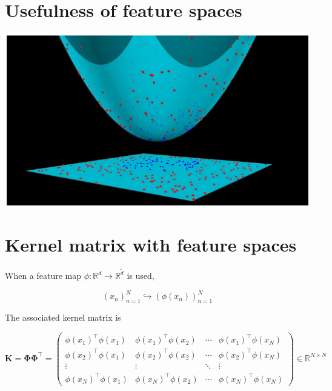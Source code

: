 \documentclass[10pt]{article}
\begin{document}
\section*{Usefulness of feature spaces}
\begin{center}
\includegraphics[max width=\textwidth]{2023_12_30_94b0d65233167cf65e4cg-10}
\end{center}

\section*{Kernel matrix with feature spaces}
When a feature map $\phi: \mathbb{R}^{d} \rightarrow \mathbb{R}^{\tilde{d}}$ is used,

$$
\left(x_{n}\right)_{n=1}^{N} \hookrightarrow\left(\phi\left(x_{n}\right)\right)_{n=1}^{N}
$$

The associated kernel matrix is

$$
\mathbf{K}=\boldsymbol{\Phi} \boldsymbol{\Phi}^{\top}=\left(\begin{array}{cccc}
\phi\left(x_{1}\right)^{\top} \phi\left(x_{1}\right) & \phi\left(x_{1}\right)^{\top} \phi\left(x_{2}\right) & \cdots & \phi\left(x_{1}\right)^{\top} \phi\left(x_{N}\right) \\
\phi\left(x_{2}\right)^{\top} \phi\left(x_{1}\right) & \phi\left(x_{2}\right)^{\top} \phi\left(x_{2}\right) & \cdots & \phi\left(x_{2}\right)^{\top} \phi\left(x_{N}\right) \\
\vdots & \vdots & \ddots & \vdots \\
\phi\left(x_{N}\right)^{\top} \phi\left(x_{1}\right) & \phi\left(x_{N}\right)^{\top} \phi\left(x_{2}\right) & \cdots & \phi\left(x_{N}\right)^{\top} \phi\left(x_{N}\right)
\end{array}\right) \in \mathbb{R}^{N \times N}
$$
\end{document}
